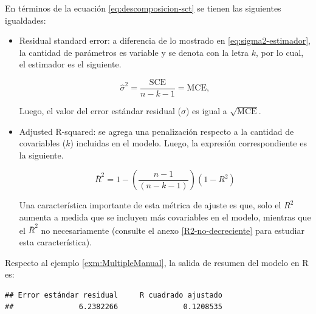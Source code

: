 \documentclass[
  11pt,
]{book}
\newenvironment{Shaded}{\begin{snugshade}}{\end{snugshade}}
\newcommand{\CommentTok}[1]{\textcolor[rgb]{0.56,0.35,0.01}{\textit{#1}}}
\newcommand{\FunctionTok}[1]{\textcolor[rgb]{0.13,0.29,0.53}{\textbf{#1}}}
\newcommand{\NormalTok}[1]{#1}
\newcommand{\OtherTok}[1]{\textcolor[rgb]{0.56,0.35,0.01}{#1}}
\newcommand{\SpecialCharTok}[1]{\textcolor[rgb]{0.81,0.36,0.00}{\textbf{#1}}}
\newcommand{\StringTok}[1]{\textcolor[rgb]{0.31,0.60,0.02}{#1}}
\theoremstyle{definition}
\theoremstyle{definition}
\theoremstyle{definition}
\theoremstyle{definition}
\theoremstyle{remark}
\begin{document}
En términos de la ecuación \eqref{eq:descomposicion-sct} se tienen las siguientes igualdades:

\begin{itemize}
\item
  Residual standard error: a diferencia de lo mostrado en \eqref{eq:sigma2-estimador}, la cantidad de parámetros es variable y se denota con la letra \(k\), por lo cual, el estimador es el siguiente.

  \begin{equation}
  \widehat{\sigma}^2 = \frac{\text{SCE}}{n-k-1} = \text{MCE},
  \label{eq:error-estandar-residual-RLM}
  \end{equation}

  Luego, el valor del error estándar residual (\(\widehat{\sigma}\)) es igual a \(\sqrt{\text{MCE}}\).
\item
  Adjusted R-squared: se agrega una penalización respecto a la cantidad de covariables (\(k\)) incluidas en el modelo. Luego, la expresión correspondiente es la siguiente.

  \begin{equation}
  \bar{R}^2 = 1-\left(\frac{n-1}{(n-k-1)}\right)(1-R^2)
  \label{eq:r2-ajustado}
  \end{equation}

  Una característica importante de esta métrica de ajuste es que, solo el \(R^2\) aumenta a medida que se incluyen más covariables en el modelo, mientras que el \(\bar{R}^2\) no necesariamente (consulte el anexo \ref{R2-no-decreciente} para estudiar esta característica).
\end{itemize}

Respecto al ejemplo \ref{exm:MultipleManual}, la salida de resumen del modelo en R es:

\begin{Shaded}
\end{Shaded}

\begin{verbatim}
## Error estándar residual     R cuadrado ajustado 
##               6.2382266               0.1208535
\end{verbatim}
\end{document}
